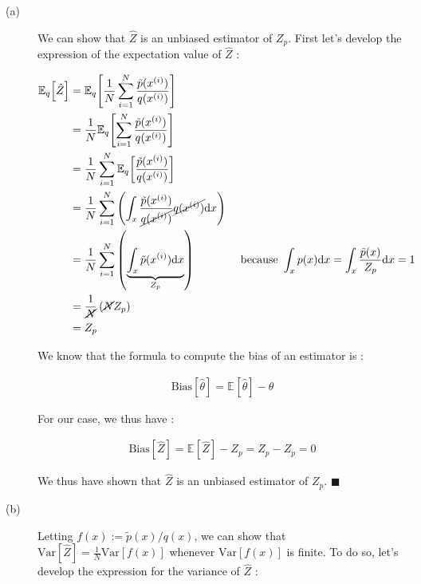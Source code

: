 \documentclass[11pt]{article}
\newcommand{\Var}[1]{\mathrm{Var}\!\left[#1 \right]}
\newcommand{\Bias}[1]{\mathrm{Bias}\!\left[#1 \right]}
\newcommand{\Expect}[2][]{\mathbb{E}_{#1}\!\left[#2 \right]}
\newcommand{\diff}{\mathrm{d}}
\begin{document}
\begin{description}
\item [(a)] We can show that $\hat{Z}$ is an unbiased estimator of $Z_p$. First let's develop the expression of the expectation value of $\hat{Z}$ :

\begin{align*}
\Expect[q]{\hat{Z}} & = \Expect[q]{ \frac{1}{N} \sum_{i=1} ^{N} \frac{\tilde{p}(x^{(i)})}{q(x^{(i)})}} \\
								 & = \frac{1}{N} \Expect[q]{\sum_{i=1} ^{N} \frac{\tilde{p}(x^{(i)})}{q(x^{(i)})}} \\
								 & = \frac{1}{N} \sum_{i=1} ^{N} \Expect[q]{ \frac{\tilde{p}(x^{(i)})}{q(x^{(i)})}} \\
								 & = \frac{1}{N} \sum_{i=1} ^{N} \left( \int_x \frac{\tilde{p}(x^{(i)})}{\cancel{q(x^{(i)})}} \cancel{q(x^{(i)})} \diff x \right) \\
								 & = \frac{1}{N} \sum_{i=1} ^{N} \left( \underbrace{\int_x \tilde{p}(x^{(i)})\diff x}_{Z_p} \right) && \text{ because } \int_x p(x)\diff x = \int_x \frac{\tilde{p}(x)}{Z_p} \diff x = 1 \\
								 & = \frac{1}{\cancel{N}} \left(\cancel{N} Z_p\right) \\
								 & = Z_p
\end{align*}

We know that the formula to compute the bias of an estimator is :

\begin{align*}
\Bias{\hat{\theta}} = \Expect{\hat{\theta}} - \theta
\end{align*}

For our case, we thus have :

\begin{align*}
\Bias{\hat{Z}} = \Expect{\hat{Z}} - Z_p = Z_p - Z_p = 0
\end{align*}

We thus have shown that $\hat{Z}$ is an unbiased estimator of $Z_p$. $\blacksquare$


\item [(b)] Letting $f(x) := \tilde{p}(x)/q(x)$, we can show that $\Var{\hat{Z}} = \frac{1}{N} \Var{f(x)}$ whenever $\Var{f(x)}$ is finite. To do so, let's develop the expression for the variance of $\hat{Z}$ :


\end{description}
\end{document}
